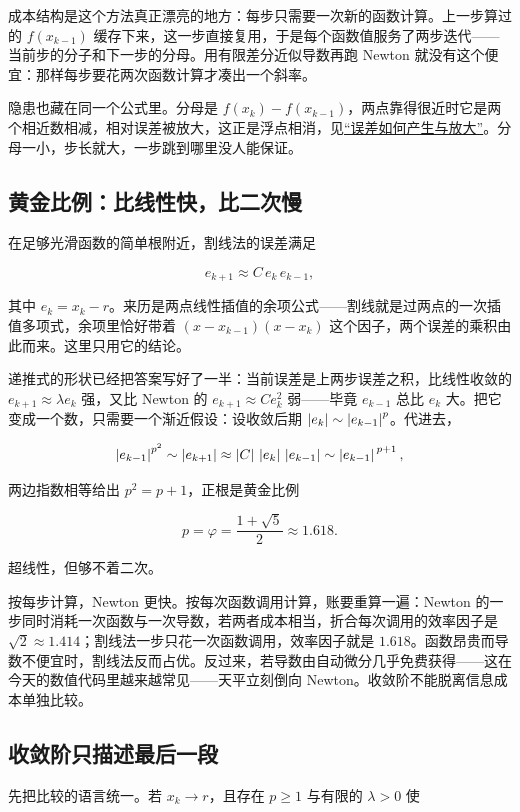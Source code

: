 成本结构是这个方法真正漂亮的地方：每步只需要一次新的函数计算。上一步算过的 \(f(x_{k-1})\) 缓存下来，这一步直接复用，于是每个函数值服务了两步迭代——当前步的分子和下一步的分母。用有限差分近似导数再跑 Newton 就没有这个便宜：那样每步要花两次函数计算才凑出一个斜率。

隐患也藏在同一个公式里。分母是 \(f(x_k)-f(x_{k-1})\)，两点靠得很近时它是两个相近数相减，相对误差被放大，这正是浮点相消，见\hyperref[sec:08-Numerical-Analysis/01-Floating-Point-and-Error/02]{``误差如何产生与放大''}。分母一小，步长就大，一步跳到哪里没人能保证。

\subsection{黄金比例：比线性快，比二次慢}

在足够光滑函数的简单根附近，割线法的误差满足

\[
e_{k+1}\approx C\,e_k\,e_{k-1},
\]

其中 \(e_k=x_k-r\)。来历是两点线性插值的余项公式——割线就是过两点的一次插值多项式，余项里恰好带着 \((x-x_{k-1})(x-x_k)\) 这个因子，两个误差的乘积由此而来。这里只用它的结论。

递推式的形状已经把答案写好了一半：当前误差是上两步误差之积，比线性收敛的 \(e_{k+1}\approx\lambda e_k\) 强，又比 Newton 的 \(e_{k+1}\approx Ce_k^2\) 弱——毕竟 \(e_{k-1}\) 总比 \(e_k\) 大。把它变成一个数，只需要一个渐近假设：设收敛后期 \(\left|e_k\right|\sim\left|e_{k-1}\right|^p\)。代进去，

\[
\left|e_{k-1}\right|^{p^2}\sim\left|e_{k+1}\right|\approx\left|C\right|\,\left|e_k\right|\,\left|e_{k-1}\right|\sim\left|e_{k-1}\right|^{\,p+1},
\]

两边指数相等给出 \(p^2=p+1\)，正根是黄金比例

\[
p=\varphi=\frac{1+\sqrt5}{2}\approx1.618 .
\]

超线性，但够不着二次。

按每步计算，Newton 更快。按每次函数调用计算，账要重算一遍：Newton 的一步同时消耗一次函数与一次导数，若两者成本相当，折合每次调用的效率因子是 \(\sqrt2\approx1.414\)；割线法一步只花一次函数调用，效率因子就是 \(1.618\)。函数昂贵而导数不便宜时，割线法反而占优。反过来，若导数由自动微分几乎免费获得——这在今天的数值代码里越来越常见——天平立刻倒向 Newton。收敛阶不能脱离信息成本单独比较。

\subsection{收敛阶只描述最后一段}

先把比较的语言统一。若 \(x_k\to r\)，且存在 \(p\ge1\) 与有限的 \(\lambda>0\) 使

